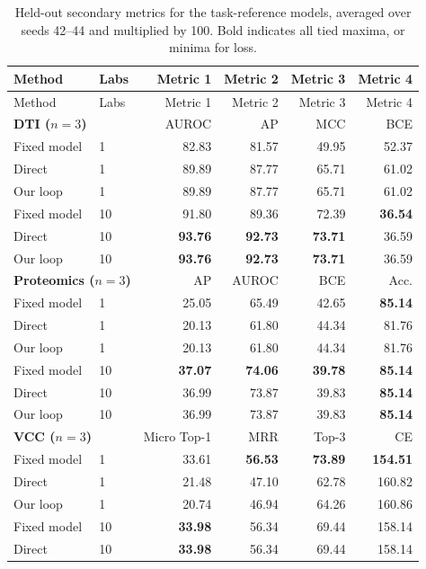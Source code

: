 \begin{longtable}{llrrrr}
\caption{Held-out secondary metrics for the task-reference models, averaged over seeds 42--44 and multiplied by 100. Bold indicates all tied maxima, or minima for loss.}\label{tab:strong-secondary}\\
\toprule Method & Labs & Metric 1 & Metric 2 & Metric 3 & Metric 4 \\ \midrule\endfirsthead
\toprule Method & Labs & Metric 1 & Metric 2 & Metric 3 & Metric 4 \\ \midrule\endhead
\multicolumn{2}{l}{\textbf{DTI ($n=3$)}} & AUROC & AP & MCC & BCE \\
Fixed model & 1 & 82.83 & 81.57 & 49.95 & 52.37 \\
Direct & 1 & 89.89 & 87.77 & 65.71 & 61.02 \\
Our loop & 1 & 89.89 & 87.77 & 65.71 & 61.02 \\
Fixed model & 10 & 91.80 & 89.36 & 72.39 & \textbf{36.54} \\
Direct & 10 & \textbf{93.76} & \textbf{92.73} & \textbf{73.71} & 36.59 \\
Our loop & 10 & \textbf{93.76} & \textbf{92.73} & \textbf{73.71} & 36.59 \\
\midrule
\multicolumn{2}{l}{\textbf{Proteomics ($n=3$)}} & AP & AUROC & BCE & Acc. \\
Fixed model & 1 & 25.05 & 65.49 & 42.65 & \textbf{85.14} \\
Direct & 1 & 20.13 & 61.80 & 44.34 & 81.76 \\
Our loop & 1 & 20.13 & 61.80 & 44.34 & 81.76 \\
Fixed model & 10 & \textbf{37.07} & \textbf{74.06} & \textbf{39.78} & \textbf{85.14} \\
Direct & 10 & 36.99 & 73.87 & 39.83 & \textbf{85.14} \\
Our loop & 10 & 36.99 & 73.87 & 39.83 & \textbf{85.14} \\
\midrule
\multicolumn{2}{l}{\textbf{VCC ($n=3$)}} & Micro Top-1 & MRR & Top-3 & CE \\
Fixed model & 1 & 33.61 & \textbf{56.53} & \textbf{73.89} & \textbf{154.51} \\
Direct & 1 & 21.48 & 47.10 & 62.78 & 160.82 \\
Our loop & 1 & 20.74 & 46.94 & 64.26 & 160.86 \\
Fixed model & 10 & \textbf{33.98} & 56.34 & 69.44 & 158.14 \\
Direct & 10 & \textbf{33.98} & 56.34 & 69.44 & 158.14 \\

\end{longtable}

